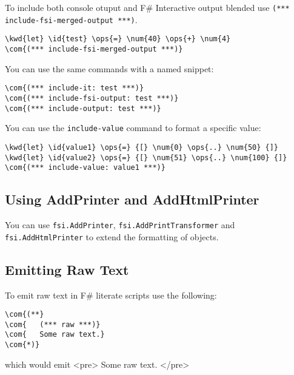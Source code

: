 \documentclass{article}
\newcommand{\id}[1]{\textcolor{black}{#1}}
\newcommand{\com}[1]{\textcolor{officegreen}{#1}}
\newcommand{\kwd}[1]{\textcolor{navy}{#1}}
\newcommand{\num}[1]{\textcolor{officegreen}{#1}}
\newcommand{\ops}[1]{\textcolor{purple}{#1}}
\begin{document}
To include both console otuput and F\# Interactive output blended use \texttt{(*** include-fsi-merged-output ***)}.
\begin{Verbatim}[commandchars=\\\{\}]
\kwd{let} \id{test} \ops{=} \num{40} \ops{+} \num{4}
\com{(*** include-fsi-merged-output ***)}

\end{Verbatim}



You can use the same commands with a named snippet:
\begin{Verbatim}[commandchars=\\\{\}]
\com{(*** include-it: test ***)}
\com{(*** include-fsi-output: test ***)}
\com{(*** include-output: test ***)}

\end{Verbatim}



You can use the \texttt{include-value} command to format a specific value:
\begin{Verbatim}[commandchars=\\\{\}]
\kwd{let} \id{value1} \ops{=} {[} \num{0} \ops{..} \num{50} {]}
\kwd{let} \id{value2} \ops{=} {[} \num{51} \ops{..} \num{100} {]}
\com{(*** include-value: value1 ***)}

\end{Verbatim}

\subsection*{Using AddPrinter and AddHtmlPrinter}



You can use \texttt{fsi.AddPrinter}, \texttt{fsi.AddPrintTransformer} and \texttt{fsi.AddHtmlPrinter} to extend the formatting of objects.
\subsection*{Emitting Raw Text}



To emit raw text in F\# literate scripts use the following:
\begin{Verbatim}[commandchars=\\\{\}]
\com{(**}
\com{	(*** raw ***)}
\com{	Some raw text.}
\com{*)}

\end{Verbatim}



which would emit
<pre>
Some raw text.
</pre>
\end{document}
